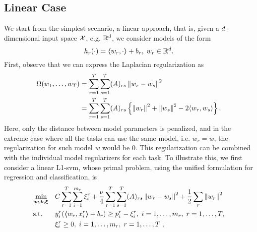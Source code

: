\subsection{Linear Case}
We start from the simplest scenario, a linear approach, that is, given a $d$-dimensional input space $\mathcal{X}$, e.g. $\mathbb{R}^d$, we consider models of the form
$$ h_r(\cdot) = \bm{\left\langle} w_r, \cdot \bm{\right\rangle} + b_r,\;  w_r \in \mathbb{R}^d .$$
First, observe that we can express the Laplacian regularization as
\begin{equation}
    \nonumber
    \begin{aligned}
        \Omega(w_1, \ldots, w_T) &= \sum_{r=1}^T \sum_{s=1}^T (A)_{rs} \left\lVert w_r - w_s\right\rVert^2 \\
        &=  \sum_{r=1}^T \sum_{s=1}^T (A)_{rs} \left\{ \left\lVert w_r\right\rVert^2 + \left\lVert w_s\right\rVert^2 - 2 \langle w_r, w_s \rangle \right\}.
    \end{aligned}
\end{equation}
Here, only the distance between model parameters is penalized, and in the extreme case where all the tasks can use the same model, i.e. $w_r = w$, the regularization for such model $w$ would be $0$.
This regularization can be combined with the individual model regularizers for each task.
To illustrate this, we first consider a linear L1-\acrshort{svm}, whose primal problem, using the unified formulation for regression and classification, is
\begin{equation}\label{eq:linear_gl_primal}
    \begin{aligned}
         & \min_{\fv{w}, \fv{b}, \fv{\xi}}
         &                                    & {C \sum_{r=1}^T \sum_{i=1}^{\npertask_r}{\xi_{i}^r} + \frac{\nu}{4} \sum_{r=1}^T \sum_{s=1}^T (A)_{rs} \norm{w_r - w_s}^2 + \frac{1}{2} \sum_r \norm{w_r}^2 }                                                               \\
         & \text{s.t.}
         &                                    & y_{i}^r ( \dotp{w_r}{x_{i}^r} + b_r) \geq p_{i}^r - \xi_{i}^r , \;  i=1,\ldots,m_r, \;  r=1,\ldots,T,                                                                                                           \\
         &                                    &                                                                                                                                                 & \xi_{i}^r \geq 0, \;  i=1,\ldots,m_r, \;  r=1,\ldots,T \; ,
    \end{aligned}
\end{equation}

